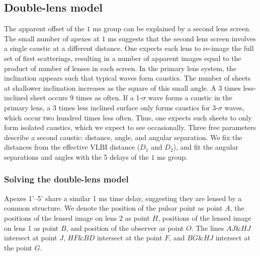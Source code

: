 \documentclass[useAMS,usenatbib]{mn2e}
\begin{document}
\subsection{Double-lens model}
\label{doublelensmodel}

The apparent offset of the $1$ ms group can be explained by a second lens
screen.  The small number of apexes at $1$ ms suggests that the second
lens screen involves a single caustic at a different distance.  One
expects each lens to re-image the full set of first scatterings,
resulting in a number of apparent images equal to the product of
number of lenses in each screen.
In the
primary lens system, the inclination appears such that typical waves
form caustics.  The number of sheets at shallower inclination
increases as the square of this small angle.  A 3 times less-inclined
sheet occurs 9 times as often.  If a 1-$\sigma$ wave forms a caustic
in the primary lens, a 3 times less inclined surface only forms
caustics for 3-$\sigma$ waves, which occur two hundred times less
often.  Thus, one expects such sheets to only form isolated caustics,
which we expect to see occasionally.  Three free parameters describe a
second caustic: distance, angle, and angular separation.  We fix the
distances from the effective VLBI distance ($D_1$ and $D_2$), and fit the angular
separations and angles with the 5 delays of the $1$ ms group.

\subsubsection{Solving the double-lens model}

Apexes 1'--5' share a similar 1 ms time delay, suggesting they are lensed by
a common structure.
We denote the position of the pulsar point as point $A$, the positions of the lensed image on lens 2 as point $H$, positions of the lensed image on lens 1 as point $B$, and position of the observer as point $O$.  
The lines $AJ\&HJ$ intersect at point $J$, $HF\&BD$ intersect at the point $F$, and $BG\&HJ$ intersect at the point $G$.
\end{document}
